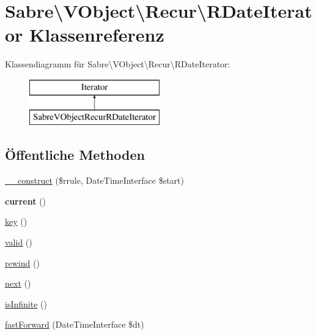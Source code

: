 \hypertarget{class_sabre_1_1_v_object_1_1_recur_1_1_r_date_iterator}{}\section{Sabre\textbackslash{}V\+Object\textbackslash{}Recur\textbackslash{}R\+Date\+Iterator Klassenreferenz}
\label{class_sabre_1_1_v_object_1_1_recur_1_1_r_date_iterator}
Klassendiagramm für Sabre\textbackslash{}V\+Object\textbackslash{}Recur\textbackslash{}R\+Date\+Iterator\+:\begin{figure}[H]
\begin{center}
\leavevmode
\includegraphics[height=2.000000cm]{class_sabre_1_1_v_object_1_1_recur_1_1_r_date_iterator}
\end{center}
\end{figure}
\subsection*{Öffentliche Methoden}
\begin{DoxyCompactItemize}
\item 
\mbox{\hyperlink{class_sabre_1_1_v_object_1_1_recur_1_1_r_date_iterator_a1047352b62ec02e80d4f7a3a8cb6dcd3}{\+\_\+\+\_\+construct}} (\$rrule, Date\+Time\+Interface \$start)
\item 
\mbox{\label{class_sabre_1_1_v_object_1_1_recur_1_1_r_date_iterator_a0e07f275c24e67ce8a81c9f92bd1ff1b}} 
{\bfseries current} ()
\item 
\mbox{\hyperlink{class_sabre_1_1_v_object_1_1_recur_1_1_r_date_iterator_afe2444c7f5c2222c234180a44c58d7e7}{key}} ()
\item 
\mbox{\hyperlink{class_sabre_1_1_v_object_1_1_recur_1_1_r_date_iterator_aa7faa7b88f6fafb55c84755ee51dcf91}{valid}} ()
\item 
\mbox{\hyperlink{class_sabre_1_1_v_object_1_1_recur_1_1_r_date_iterator_a300b6634344f0600f28d06b56ab16d66}{rewind}} ()
\item 
\mbox{\hyperlink{class_sabre_1_1_v_object_1_1_recur_1_1_r_date_iterator_a33a2480b6c001f5236bf6c74a2b86fdc}{next}} ()
\item 
\mbox{\hyperlink{class_sabre_1_1_v_object_1_1_recur_1_1_r_date_iterator_a5e8d99b21a968d3adc19846905e15ad9}{is\+Infinite}} ()
\item 
\mbox{\hyperlink{class_sabre_1_1_v_object_1_1_recur_1_1_r_date_iterator_ac39804d81fa446898ac17aaec0347eda}{fast\+Forward}} (Date\+Time\+Interface \$dt)
\end{DoxyCompactItemize}
